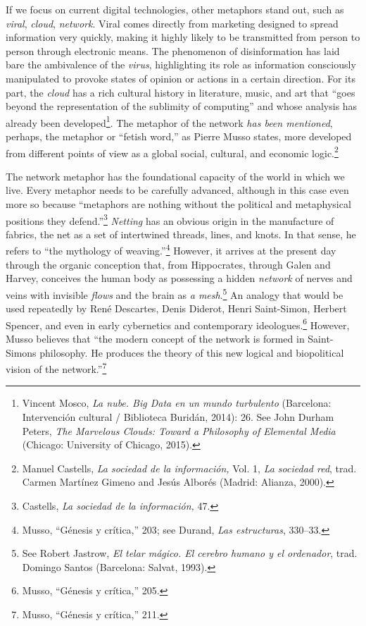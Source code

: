 \documentclass{tufte-handout}
\begin{document}
If we focus on current digital technologies, other metaphors stand out,
such as \emph{viral}, \emph{cloud}, \emph{network}. Viral comes directly
from marketing designed to spread information very quickly, making it
highly likely to be transmitted from person to person through electronic
means. The phenomenon of disinformation has laid bare the ambivalence of
the \emph{virus}, highlighting its role as information consciously
manipulated to provoke states of opinion or actions in a certain
direction. For its part, the \emph{cloud} has a rich cultural history in
literature, music, and art that ``goes beyond the representation of the
sublimity of computing'' and whose analysis has already been
developed\footnote{Vincent Mosco, \emph{La nube. Big Data en un mundo
  turbulento} (Barcelona: Intervención cultural / Biblioteca Buridán,
  2014): 26. See John Durham Peters, \emph{The Marvelous Clouds: Toward
  a Philosophy of Elemental Media} (Chicago: University of Chicago,
  2015).}. The metaphor of the network \emph{has been mentioned},
perhaps, the metaphor or ``fetish word,'' as Pierre Musso states, more
developed from different points of view as a global social, cultural,
and economic logic.\footnote{Manuel Castells, \emph{La sociedad de la
  información,} Vol. 1, \emph{La sociedad red}, trad. Carmen Martínez
  Gimeno and Jesús Alborés (Madrid: Alianza, 2000).}

The network metaphor has the foundational capacity of the world in which
we live. Every metaphor needs to be carefully advanced, although in this
case even more so because ``metaphors are nothing without the political
and metaphysical positions they defend.''\footnote{Castells, \emph{La
  sociedad de la información,} 47.} \emph{Netting} has an obvious origin
in the manufacture of fabrics, the net as a set of intertwined threads,
lines, and knots. In that sense, he refers to ``the mythology of
weaving.''\footnote{Musso, ``Génesis y crítica,'' 203; see Durand,
  \emph{Las estructuras}, 330--33.} However, it arrives at the present
day through the organic conception that, from Hippocrates, through Galen
and Harvey, conceives the human body as possessing a hidden
\emph{network} of nerves and veins with invisible \emph{flows} and the
brain as \emph{a mesh}.\footnote{See Robert Jastrow, \emph{El telar
  mágico. El cerebro humano y el ordenador}, trad. Domingo Santos
  (Barcelona: Salvat, 1993).} An analogy that would be used repeatedly
by René Descartes, Denis Diderot, Henri Saint-Simon, Herbert Spencer,
and even in early cybernetics and contemporary ideologues.\footnote{Musso,
  ``Génesis y crítica,'' 205.} However, Musso believes that ``the modern
concept of the network is formed in Saint-Simon\textquotesingle s
philosophy. He produces the theory of this new logical and biopolitical
vision of the network.''\footnote{Musso, ``Génesis y crítica,'' 211.}
\end{document}
